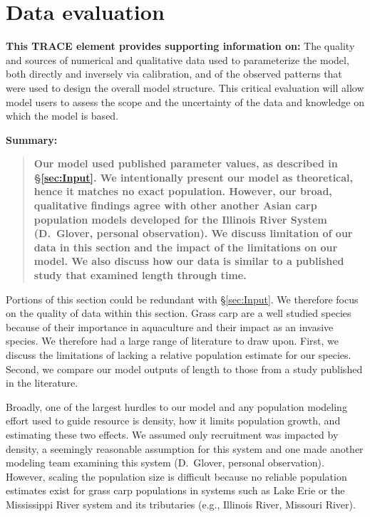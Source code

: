 \documentclass{article}[12pt]
\begin{document}
\stopcontents[sections]

\section{Data evaluation}\label{sec:dev}

\textbf{This TRACE element provides supporting information on:} The quality and sources of numerical and qualitative data used to parameterize the model, both directly and inversely via calibration, and of the observed patterns that were used to design the overall model structure. This critical evaluation will allow model users to assess the scope and the uncertainty of the data and knowledge on which the model is based.

\textbf{Summary:}
\begin{verse}
\textbf{
Our model used published parameter values, as described in \S \ref{sec:Input}.
We intentionally present our model as theoretical, hence it matches no exact population.
However, our broad, qualitative findings agree with other another Asian carp population models developed for the Illinois River System (D.~Glover, personal observation).
We discuss limitation of our data in this section and the impact of the limitations on our model.
We also discuss how our data is similar to a published study that examined length through time.
}
\end{verse}

Portions of this section could be redundant with \S \ref{sec:Input}.
We therefore focus on the quality of data within this section.
Grass carp are a well studied species because of their importance in aquaculture and their impact as an invasive species.
We therefore had a large range of literature to draw upon.
First, we discuss the limitations of lacking a relative population estimate for our species.
Second, we compare our model outputs of length to those from a study published in the literature.

Broadly, one of the largest hurdles to our model and any population modeling effort used to guide resource is density, how it limits population growth, and estimating these two effects.
We assumed only recruitment was impacted by density, a seemingly reasonable assumption for this system and one made another modeling team examining this system (D.~Glover, personal observation).
However, scaling the population size is difficult because no reliable population estimates exist for grass carp populations in systems such as Lake Erie or the Mississippi River system and its tributaries (e.g., Illinois River, Missouri River).  
\end{document}
